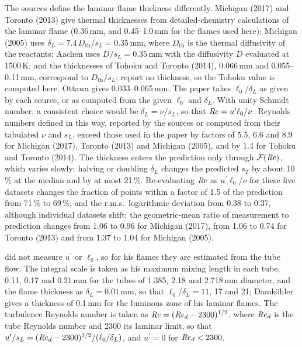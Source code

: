 \documentclass[11pt]{article}
\providecommand{\Rey}{\mbox{\textit{Re}}}
\newcommand{\sL}{s_L}
\newcommand{\dL}{\delta_L}
\newcommand{\up}{u^{\prime}}
\begin{document}
The sources define the laminar flame thickness differently. Michigan (2017) and Toronto (2013) give thermal thicknesses from detailed-chemistry calculations of the laminar flame (0.36\,mm, and 0.45--1.0\,mm for the flames used here); Michigan (2005) uses $\dL = 7.4 \, D_{\mathrm{th}} / \sL = 0.35$\,mm, where $D_{\mathrm{th}}$ is the thermal diffusivity of the reactants; Aachen uses $D / \sL = 0.35$\,mm with the diffusivity $D$ evaluated at 1500\,K; and the thicknesses of Tohoku and Toronto (2014), 0.066\,mm and 0.055--0.11\,mm, correspond to $D_{\mathrm{th}} / \sL$; \citet{Kobayashi1996} report no thickness, so the Tohoku value is computed here. Ottawa gives 0.033--0.065\,mm.
The paper takes $\ell_0 / \dL$ as given by each source, or as computed from the given $\ell_0$ and $\dL$. With unity Schmidt number, a consistent choice would be $\dL = \nu / \sL$, so that $\Rey = \up \ell_0 / \nu$. Reynolds numbers defined in this way, reported by the sources or computed from their tabulated $\nu$ and $\sL$, exceed those used in the paper by factors of 5.5, 6.6 and 8.9 for Michigan (2017), Toronto (2013) and Michigan (2005), and by 1.4 for Tohoku and Toronto (2014). The thickness enters the prediction only through $\mathcal{F}(\Rey)$, which varies slowly: halving or doubling $\dL$ changes the predicted $s_T$ by about 10\,\% at the median and by at most 21\,\%. Re-evaluating $\Rey$ as $\up \ell_0 / \nu$ for these five datasets changes the fraction of points within a factor of 1.5 of the prediction from 71\,\% to 69\,\%, and the r.m.s.\ logarithmic deviation from 0.38 to 0.37, although individual datasets shift: the geometric-mean ratio of measurement to prediction changes from 1.06 to 0.96 for Michigan (2017), from 1.06 to 0.74 for Toronto (2013) and from 1.37 to 1.04 for Michigan (2005).

\citet{Damkohler1940} did not measure $\up$ or $\ell_0$, so for his flames they are estimated from the tube flow. The integral scale is taken as his maximum mixing length in each tube, 0.11, 0.17 and 0.21\,mm for the tubes of 1.385, 2.18 and 2.718\,mm diameter, and the flame thickness as $\dL = 0.01$\,mm, so that $\ell_0 / \dL = 11$, 17 and 21; Damk\"ohler gives a thickness of 0.1\,mm for the luminous zone of his laminar flames. The turbulence Reynolds number is taken as $\Rey = (\Rey_d - 2300)^{1/2}$, where $\Rey_d$ is the tube Reynolds number and 2300 its laminar limit, so that $\up / \sL = (\Rey_d - 2300)^{1/2} / (\ell_0 / \dL)$, and $\up = 0$ for $\Rey_d < 2300$.
\end{document}
